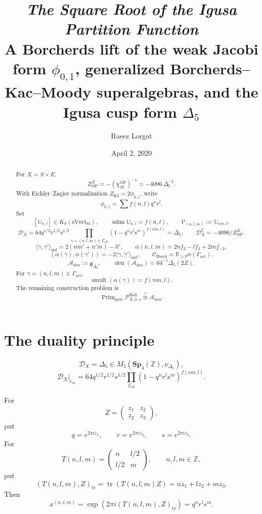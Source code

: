 \documentclass[11pt]{memoir}
\title{\texorpdfstring{\textit{The Square Root of the Igusa Partition Function}\\[0.5em]\small A Borcherds lift of the weak Jacobi form $\phi_{0,1}$, generalized Borcherds--Kac--Moody superalgebras, and the Igusa cusp form $\Delta_5$}{The Square Root of the Igusa Partition Function: A Borcherds lift of the weak Jacobi form phi 0,1, generalized Borcherds--Kac--Moody superalgebras, and the Igusa cusp form Delta 5}}
\author{Raeez Lorgat}
\date{April 2, 2020}
\newcommand{\Z}{\mathbb{Z}} \newcommand{\C}{\mathbb{C}}
\newcommand{\R}{\mathbb{R}} \newcommand{\La}{\Lambda}
\newcommand{\Sp}{\mathbf{Sp}}
\newcommand{\Cone}{\mathcal{C}}
\newcommand{\sdim}{\operatorname{sdim}}
\newcommand{\smult}{\operatorname{smult}}
\newcommand{\Prim}{\operatorname{Prim}}
\begin{document}
\maketitle

\begin{abstract}
For \(X=S\times E\),
$$
Z^X_{\mathrm{OP}}
=-\left(\chi_{10}^{\mathrm{OP}}\right)^{-1}
=-4096\,\Delta_5^{-2}.
$$
With Eichler--Zagier normalization $Z_{\mathrm{K3}}=2\phi_{0,1}$, write
$$\phi_{0,1}=\sum f(n,l)q^nr^l.$$
Set
$$
[\mathbb U_{n,l}]\in K_0(\mathrm{sVect}_{\mathrm{fd}}),\qquad
\sdim\mathbb U_{n,l}=f(n,l),\qquad
\mathcal V_{(n,l,m)}:=\mathbb U_{nm,l}.
$$
$$
\mathcal D_X
=64q^{1/2}r^{1/2}s^{1/2}
\prod_{\gamma=(n,l,m)\in\Gamma_{\mathrm{eff}}}
(1-q^nr^ls^m)^{f(nm,l)}
=\Delta_5,\qquad
\mathcal D_X^2=-4096/Z^X_{\mathrm{OP}}.
$$
$$
\langle\gamma,\gamma'\rangle_{\mathrm{ind}}
=2(nm'+n'm)-ll',\qquad
\alpha(n,l,m)=2nf_2-lf_3+2mf_{-2},
$$
$$
(\alpha(\gamma),\alpha(\gamma'))
=-2\langle\gamma,\gamma'\rangle_{\mathrm{ind}},\qquad
\Cone_{\mathrm{Borch}}=\R_{\ge0}\alpha(\Gamma_{\mathrm{act}}).
$$
$$
\mathcal A_{\mathrm{den}}:=\mathfrak g_{\Delta_5},\qquad
\operatorname{den}(\mathcal A_{\mathrm{den}})
=64^{-1}\Delta_5(2Z).
$$
For \(\gamma=(n,l,m)\in\Gamma_{\mathrm{act}}\),
$$
\smult(\alpha(\gamma))=f(nm,l).
$$
The remaining construction problem is
$$
\Prim_{\mathrm{prot}}\mathcal P^{\mathrm{Hall}}_{X,\sigma,o}
\stackrel{?}{\cong}\mathcal A_{\mathrm{den}}.
$$
\end{abstract}

\bigskip
\tableofcontents

\section{The duality principle}
\label{sec:duality-principle}

$$
\mathcal D_X=\Delta_5\in M_5(\Sp_4(\Z),\nu_{\Delta_5}),
$$
$$
\mathcal D_X|_{\mathfrak c_\infty}
=64q^{1/2}r^{1/2}s^{1/2}
\prod_{\Gamma_{\mathrm{eff}}}(1-q^nr^ls^m)^{f(nm,l)}.
$$

For
$$Z=\begin{pmatrix}z_1&z_2\\z_2&z_3\end{pmatrix},$$
put
$$q=e^{2\pi iz_1},\qquad r=e^{2\pi iz_2},\qquad s=e^{2\pi iz_3}.$$
For
$$
T(n,l,m)=
\begin{pmatrix}n&l/2\\ l/2&m\end{pmatrix},
\qquad n,l,m\in\Z,
$$
put
$$
(T(n,l,m),Z)_{\mathrm{tr}}
=\operatorname{tr}(T(n,l,m)Z)=nz_1+lz_2+mz_3.
$$
Then
$$x^{(n,l,m)}=\exp(2\pi i(T(n,l,m),Z)_{\mathrm{tr}})
=q^nr^ls^m.$$
\end{document}
